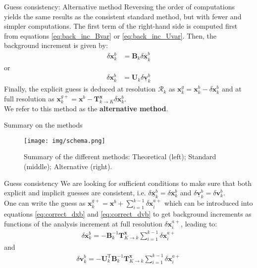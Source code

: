 \documentclass[8pt]{beamer}
\begin{document}
\begin{frame}{Guess consistency: Alternative method}
Reversing the order of computations yields the same results as the consistent standard method, but with fewer and simpler computations. The first term of the right-hand side is computed first from equations \eqref{eq:back_inc_Bvar} or \eqref{eq:back_inc_Uvar}. Then, the background increment is given by:
\begin{align}
\delta \mathbf{x}^b_k & = \mathbf{B}_k \delta \underline{\overline{\mathbf{x}}}^b_k
\end{align}
or
\begin{align}
\delta \mathbf{x}^b_k & = \mathbf{U}_k \delta \underline{\mathbf{v}}^b_k
\end{align}
Finally, the explicit guess is deduced at resolution $\mathcal{R}_k$ as $\mathbf{x}^g_k = \mathbf{x}^b_k - \delta \mathbf{x}^b_k$ and at full resolution as $\mathbf{x}^{g+}_k = \mathbf{x}^b - \mathbf{T}^\mathbf{x}_{k \rightarrow K} \delta \mathbf{x}^b_k$.\\
\vspace{+0.2cm}
We refer to this method as the \textbf{alternative method}.
\end{frame}

\begin{frame}{Summary on the methods}
\begin{center}
 \begin{figure}
  \texttt{[image: img/schema.png]}
  \caption{Summary of the different methods: Theoretical (left); Standard (middle); Alternative (right).}
 \end{figure}
\end{center}
\end{frame}

\begin{frame}{Guess consistency}
We are looking for sufficient conditions to make sure that both explicit and implicit guesses are consistent, i.e. $\delta \underline{\overline{\mathbf{x}}}^b_k = \delta \overline{\mathbf{x}}^b_k$ and $\delta \underline{\mathbf{v}}^b_k = \delta \mathbf{v}^b_k$.\\
\vspace{+0.3cm}
One can write the guess as $\mathbf{x}^{g+}_k = \mathbf{x}^{b} + \sum_{i=1}^{k-1} \delta \mathbf{x}^{a+}_i$ which can be introduced into equations \eqref{eq:correct_dxb} and \eqref{eq:correct_dvb} to get background increments as functions of the analysis increment at full resolution $\delta \mathbf{x}^{a+}_i$, leading to:
\begin{align}
\label{eq:correct_dxb_2}
\delta \overline{\mathbf{x}}^b_k = -\mathbf{B}^{-1}_k \mathbf{T}^\mathbf{x}_{K \rightarrow k} \sum_{i=1}^{k-1} \delta \mathbf{x}^{a+}_i
\end{align}
and
\begin{align}
\label{eq:correct_dvb_2}
\delta \mathbf{v}^b_k = -\mathbf{U}_k^\mathrm{T} \mathbf{B}^{-1}_k \mathbf{T}^\mathbf{x}_{K \rightarrow k} \sum_{i=1}^{k-1} \delta \mathbf{x}^{a+}_i
\end{align}
\end{frame}
\end{document}
